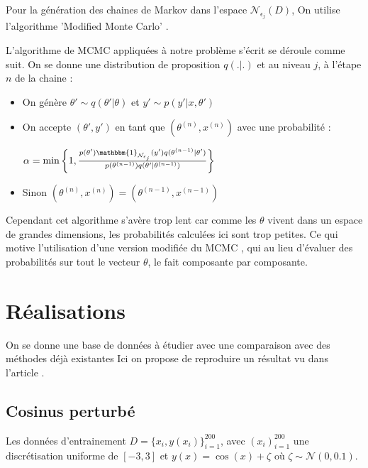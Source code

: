 \documentclass[french,12pt]{article}
\begin{document}

Pour la génération des chaines de Markov dans l'espace $\mathcal{N}_{\epsilon_{j}} (D)$, On utilise l'algorithme
'Modified Monte Carlo' \cite{Chiachio2014, Modified_MCMC}.

L'algorithme de MCMC \cite{Andrieu2003} appliquées à notre problème s'écrit se déroule comme suit.
On se donne une distribution de proposition $q(.|.)$ et au niveau $j$, à l'étape $n$ de la chaine :

\begin{itemize}
    \item On génère $\theta' \sim q(\theta' | \theta)$ et $y' \sim p(y' |x, \theta')$
    \item On accepte $(\theta', y')$ en tant que $(\theta^{(n)}, x^{(n)})$ avec une probabilité :

          $\alpha = \min \left\{ 1, \frac{p(\theta') \mathbbm{1}_{\mathcal{N}_{\epsilon_j}} (y') q(\theta^{(n - 1)} | \theta')}{p(\theta^{(n - 1)}) q(\theta' | \theta^{(n-1)})}\right\}$

    \item Sinon $(\theta^{(n)}, x^{(n)}) = (\theta^{(n-1)}, x^{(n-1)})$
\end{itemize}

Cependant cet algorithme s'avère trop lent car comme les $\theta$ vivent dans un
espace de grandes dimensions, les probabilités calculées ici sont trop petites. Ce
qui motive l'utilisation d'une version modifiée du MCMC \cite{Modified_MCMC}, qui au lieu
d'évaluer des probabilités sur tout le vecteur $\theta$, le fait composante par composante.


\pagebreak
\section{Réalisations}
On se donne une base de données à étudier avec une comparaison avec des méthodes déjà existantes \cite{Chiachio2014,Fernndez2022,Uncertainty_Deep}
Ici on propose de reproduire un résultat vu dans l'article \cite{Fernndez2022}.

\subsection{Cosinus perturbé}

Les données d'entrainement $D = \{x_i , y(x_i)\}_{i = 1}^{200}$, avec $(x_i)_{i = 1}^{200}$
une discrétisation uniforme de $[-3, 3]$ et $y(x) = \cos(x) + \zeta$ où $\zeta \sim \mathcal{N}(0, 0.1)$.
\end{document}
